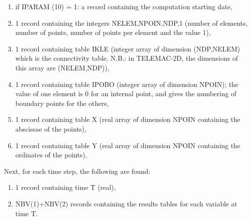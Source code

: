 \begin{enumerate}
\item  if IPARAM (10) = 1: a record containing the computation starting date,

\item  1 record containing the integers NELEM,NPOIN,NDP,1 (number of elements, number of points, number of points per element and the value 1),

\item  1 record containing table IKLE (integer array of dimension (NDP,NELEM) which is the connectivity table. N.B.: in TELEMAC-2D, the dimensions of this array are (NELEM,NDP)),

\item  1 record containing table IPOBO (integer array of dimension NPOIN); the value of one element is 0 for an internal point, and gives the numbering of boundary points for the others,

\item  1 record containing table X (real array of dimension NPOIN containing the abscissae of the points),

\item  1 record containing table Y (real array of dimension NPOIN containing the ordinates of the points),
\end{enumerate}

 Next, for each time step, the following are found:

\begin{enumerate}
\item  1 record containing time T (real),

\item  NBV(1)+NBV(2) records containing the results tables for each variable at time T.
\end{enumerate}

